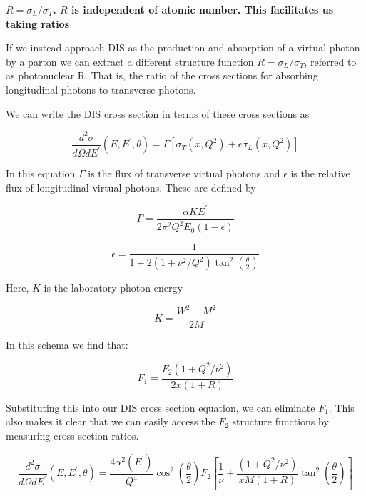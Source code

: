 \textbf{$R=\sigma_L/\sigma_T$. $R$ is independent of atomic number. This facilitates us taking ratios}

If we instead approach DIS as the production and absorption of a virtual photon by a parton we can extract a different structure function $R=\sigma_L/\sigma_T$, referred to as photonuclear R. That is, the ratio of the cross sections for absorbing longitudinal photons to transverse photons.

We can write the DIS cross section in terms of these cross sections as

\begin{equation}
	\frac{d^2\sigma}{d\Omega dE^\prime}\left(E,E^\prime,\theta\right) = \Gamma\left[\sigma_T\left(x,Q^2\right)+\epsilon\sigma_L\left(x,Q^2\right)\right]
\end{equation}

In this equation $\Gamma$ is the flux of transverse virtual photons and $\epsilon$ is the relative flux of longitudinal virtual photons. These are defined by

\begin{equation}
	\Gamma = \frac{\alpha KE^\prime}{2\pi^2Q^2E_0\left(1-\epsilon\right)}
\end{equation}

\begin{equation}
	\epsilon = \frac{1}{1+2\left(1+\nu^2/Q^2\right)\tan^2\left(\frac{\theta}{2}\right)}
\end{equation}

Here, $K$ is the laboratory photon energy

\begin{equation}
	K = \frac{W^2-M^2}{2M}
\end{equation}

In this schema we find that:

\begin{equation}
	F_1 = \frac{F_2\left(1+Q^2/\nu^2\right)}{2x\left(1+R\right)}
\end{equation}

Substituting this into our DIS cross section equation, we can eliminate $F_1$. This also makes it clear that we can easily access the $F_2$ structure functions by measuring cross section ratios.

\begin{equation}
	\frac{d^2\sigma}{d\Omega dE^\prime}\left(E,E^\prime,\theta\right) = \frac{4\alpha^2\left(E^\prime\right)}{Q^4}\cos^2\left(\frac{\theta}{2}\right)F_2\left[\frac{1}{\nu}+\frac{\left(1+Q^2/\nu^2\right)}{xM\left(1+R\right)}\tan^2\left(\frac{\theta}{2}\right)\right]
\end{equation}

